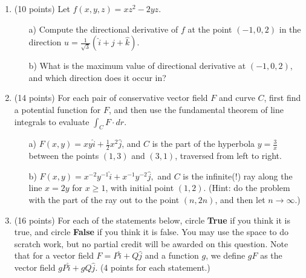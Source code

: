 \documentclass[12 pt]{report}
\begin{document}
\newpage
\begin{enumerate}

\item (10 points) Let $f(x,y,z) = xz^2 - 2yz$. 

\begin{enumerate} \item[a)] Compute the directional derivative of $f$ at the point $(-1,0,2)$ in the direction $u = \frac{1}{\sqrt{3}} (\hat{i} + \hat{j} + \hat{k})$. 

\vfill 

\item[b)] What is the maximum value of directional derivative at $(-1,0,2)$, and which direction does it occur in?

\vfill

\end{enumerate}

\newpage

\item (14 points) For each pair of conservative vector field $F$ and curve $C$, first find a potential function for $F$, and then use the fundamental theorem of line integrals to evaluate $\int_C F \cdot dr$. 

\begin{enumerate} \item[a)] $F(x,y) = xy \hat{i} + \frac{1}{2}x^2 \hat{j}$, and $C$ is the part of the hyperbola $y = \frac{3}{x}$ between the points $(1,3)$ and $(3,1)$, traversed from left to right. 

\vfill

\item[b)] $F(x,y) = x^{-2} y^{-1} \hat{i} + x^{-1}y^{-2} \hat{j},$ and $C$ is the infinite(!) ray along the line $x = 2y$ for $x \geq 1$, with initial point $(1,2)$. (Hint: do the problem with the part of the ray out to the point $(n, 2n)$, and then let $n \to \infty.$)

\vfill

\end{enumerate}

\newpage


\item (16 points) For each of the statements below, circle \textbf{True} if you think it is true, and circle \textbf{False} if you think it is false. You may use the space to do scratch work, but no partial credit will be awarded on this question. Note that for a vector field $F = P \hat{i} + Q \hat{j}$ and a function $g$, we define $gF$ as the vector field $gP \hat{i} + gQ \hat{j}$. (4 points for each statement.)


\end{enumerate}
\end{document}
